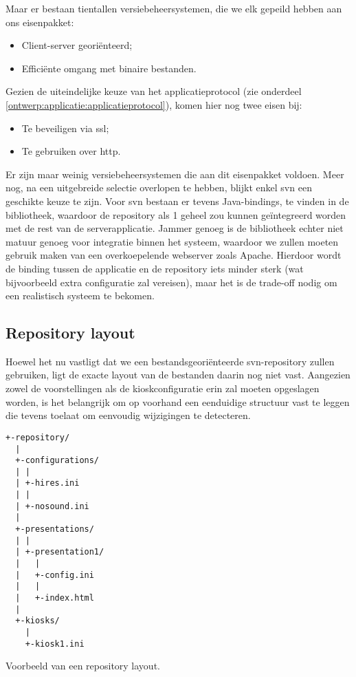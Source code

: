 Maar er bestaan tientallen versiebeheersystemen, die we elk gepeild hebben aan ons eisenpakket:
\begin{itemize}
\item Client-server georiënteerd;
\item Efficiënte omgang met binaire bestanden.
\end{itemize}

Gezien de uiteindelijke keuze van het applicatieprotocol (zie onderdeel \ref{ontwerp:applicatie:applicatieprotocol}), komen hier nog twee eisen bij:
\begin{itemize}
\item Te beveiligen via \ac{ssl};
\item Te gebruiken over \ac{http}.
\end{itemize}

Er zijn maar weinig versiebeheersystemen die aan dit eisenpakket voldoen. Meer nog, na een uitgebreide selectie overlopen te hebben, blijkt enkel \ac{svn} een geschikte keuze te zijn. Voor \ac{svn} bestaan er tevens Java-bindings, te vinden in de  bibliotheek, waardoor de repository als 1 geheel zou kunnen geïntegreerd worden met de rest van de serverapplicatie. Jammer genoeg is de bibliotheek echter niet matuur genoeg voor integratie binnen het systeem, waardoor we zullen moeten gebruik maken van een overkoepelende webserver zoals Apache. Hierdoor wordt de binding tussen de applicatie en de repository iets minder sterk (wat bijvoorbeeld extra configuratie zal vereisen), maar het is de trade-off nodig om een realistisch systeem te bekomen.

\subsection{Repository layout}

Hoewel het nu vastligt dat we een bestandsgeoriënteerde \ac{svn}-repository zullen gebruiken, ligt de exacte layout van de bestanden daarin nog niet vast. Aangezien zowel de voorstellingen als de kioskconfiguratie erin zal moeten opgeslagen worden, is het belangrijk om op voorhand een eenduidige structuur vast te leggen die tevens toelaat om eenvoudig wijzigingen te detecteren.

\begin{code}
\begin{verbatim}
+-repository/
  |
  +-configurations/
  | |
  | +-hires.ini
  | |
  | +-nosound.ini
  |
  +-presentations/
  | |
  | +-presentation1/
  |   |
  |   +-config.ini
  |   |
  |   +-index.html
  |
  +-kiosks/
    |
    +-kiosk1.ini
\end{verbatim}
\caption{Voorbeeld van een repository layout.}
\end{code}

